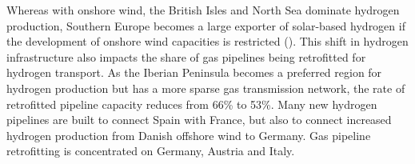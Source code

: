 
Whereas with onshore wind, the  British Isles and North Sea dominate hydrogen
production, Southern Europe becomes a large exporter of solar-based hydrogen if
the development of onshore wind capacities is restricted
(). This shift in hydrogen
infrastructure also impacts the share of gas pipelines being retrofitted for
hydrogen transport. As the Iberian Peninsula becomes a preferred region for
hydrogen production but has a more sparse gas transmission network, the rate of
retrofitted pipeline capacity reduces from 66\% to 53\%. Many new hydrogen
pipelines are built to connect Spain with France, but also to connect increased
hydrogen production from Danish offshore wind to Germany. Gas pipeline
retrofitting is concentrated on Germany, Austria and Italy.
